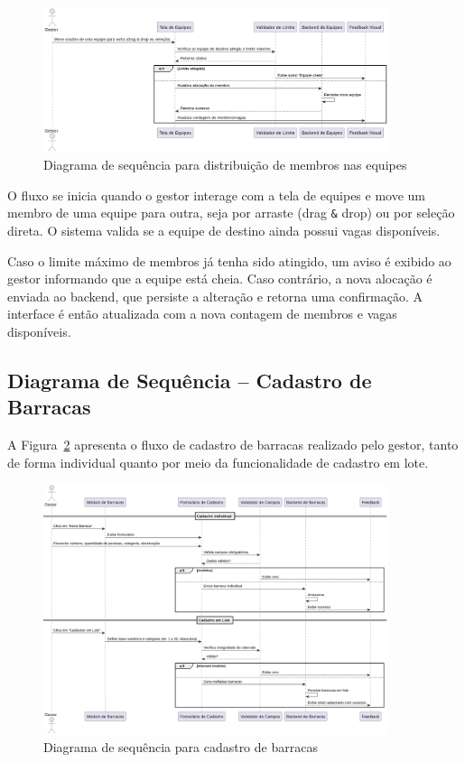 \begin{figure}[H]
    \centering
    \includegraphics[width=0.9\textwidth]{images/diagramasdesequencias/teamDistribution.png}
    \caption{Diagrama de sequência para distribuição de membros nas equipes}
    \label{fig:teamDistribution}
\end{figure}

O fluxo se inicia quando o gestor interage com a tela de equipes e move um membro de uma equipe para outra, seja por arraste (drag \texttt{\&} drop) ou por seleção direta. O sistema valida se a equipe de destino ainda possui vagas disponíveis.

Caso o limite máximo de membros já tenha sido atingido, um aviso é exibido ao gestor informando que a equipe está cheia. Caso contrário, a nova alocação é enviada ao backend, que persiste a alteração e retorna uma confirmação. A interface é então atualizada com a nova contagem de membros e vagas disponíveis.

\subsection{Diagrama de Sequência – Cadastro de Barracas}

A Figura~\ref{fig:tentCreate} apresenta o fluxo de cadastro de barracas realizado pelo gestor, tanto de forma individual quanto por meio da funcionalidade de cadastro em lote.

\begin{figure}[H]
    \centering
    \includegraphics[width=0.9\textwidth]{images/diagramasdesequencias/tentCreation.png}
    \caption{Diagrama de sequência para cadastro de barracas}
    \label{fig:tentCreate}
\end{figure}

